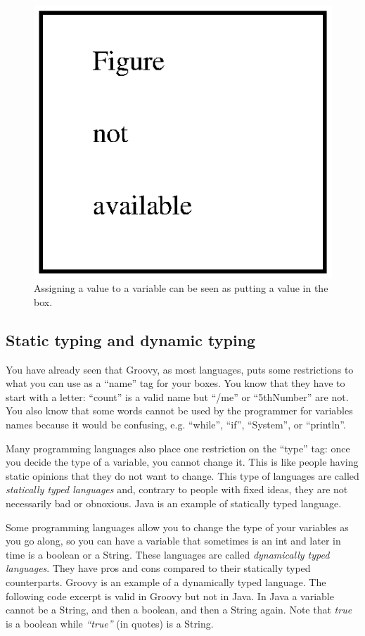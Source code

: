 \begin{figure}
  \centering
  \includegraphics{gfx/no_figure}
  \caption{Assigning a value to a variable can be seen as putting a
    value in the box.}
  \label{fig:var1}
\end{figure}

\subsection{Static typing and dynamic typing}
\label{sec:strong-typing-weak}

You have already seen that Groovy, as most languages, puts some
restrictions to what you can use as a ``name'' tag for your boxes. You
know that they have to start with a letter: ``count'' is a valid name
but ``/me'' or ``5thNumber'' are not. You also know that some words
cannot be used by the programmer for variables names because it would
be confusing, e.g. ``while'', ``if'', ``System'', or ``println''.

Many programming languages also place one restriction on the ``type''
tag: once you decide the type of a variable, you cannot change
it. This is like people having static opinions that they do not want
to change. This type of languages are called \emph{statically typed
  languages} and, contrary to people with fixed ideas, they are
not necessarily bad or obnoxious. Java is an example of
statically typed language. 

Some programming languages allow you to change the type of your
variables as you go along, so you can have a variable that sometimes
is an int and later in time is a boolean or a String. These languages
are called \emph{dynamically typed languages}. They have pros and cons
compared to their statically typed counterparts. Groovy is an example
of a dynamically typed language. The following code excerpt is valid
in Groovy but not in Java. In Java a variable cannot be a String, and
then a boolean, and then a String again. Note that \emph{true} is a
boolean while \emph{``true''} (in quotes) is a String. 

